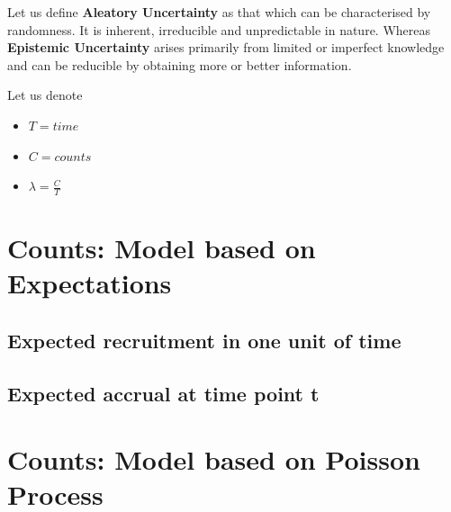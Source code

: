Let us define \textbf{Aleatory Uncertainty} as that which can be characterised by randomness. It is inherent, irreducible and unpredictable in nature. Whereas \textbf{Epistemic Uncertainty} arises primarily from limited or imperfect knowledge and can be reducible by obtaining more or better information. 

Let us denote

\begin{itemize}
\item $T=time$
\item $C=counts$
\item $\lambda=\frac{C}{T}$
\end{itemize}

\begin{table}[h!]
\centering
{}
\caption{Aleatory and epistemic uncertainty in accrual shown by different models for counts.}
\label{tab:count_modeling}
\end{table}

\section{Counts: Model based on Expectations}

\subsection{Expected recruitment in one unit of time}
\subsection{Expected accrual at time point t}

\section{Counts: Model based on Poisson Process}

